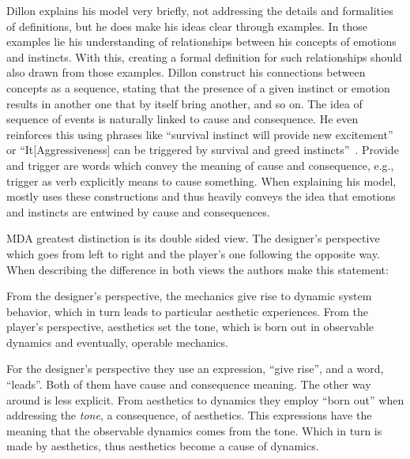 Dillon explains his model very briefly, not addressing the details and formalities of definitions, but he does make his ideas clear through examples. In those examples lie
 his understanding of relationships between his concepts of emotions and instincts. With this, creating a formal definition for such relationships should also drawn from those examples. Dillon construct his connections between concepts as a sequence, stating that the presence of a given instinct or emotion results in another one that by itself bring another, and so on. The idea of sequence of events is naturally linked to cause and consequence. He even reinforces this using phrases like ``survival instinct will provide new excitement''~\citep[p. 13]{dillon_way_2010} or ``It[Aggressiveness] can be triggered by survival and greed instincts''~\citep[p. 14]{dillon_way_2010}. Provide and trigger are words which convey the meaning of cause and consequence, e.g., trigger as verb explicitly means to cause something. When explaining his model, \citet{dillon_way_2010} mostly uses these constructions and thus heavily conveys  the idea that emotions and instincts are entwined by cause and consequences. 


MDA greatest distinction is its double sided view. The designer's perspective which goes from left to right and the player's one following the opposite way. When describing the difference in both views the authors make this statement: 

\begin{citacao}
From the designer's perspective, the mechanics give rise to
dynamic system behavior, which in turn leads to particular
aesthetic experiences. From the player's perspective,
aesthetics set the tone, which is born out in observable
dynamics and eventually, operable mechanics.
\cite{Hunicke2004}
\end{citacao}


For the designer's perspective they use an expression, ``give rise'', and a word, ``leads''. Both of them have cause and consequence meaning. The other way around is less explicit. From aesthetics to dynamics they employ ``born out'' when addressing the \textit{tone}, a consequence, of aesthetics. This expressions have the meaning that the observable dynamics comes from the tone. Which in turn is made by aesthetics, thus aesthetics become a cause of dynamics. 

